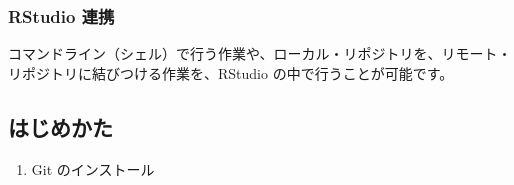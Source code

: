 \documentclass[
  xelatex, ja=standard]{bxjsbook}
\providecommand{\tightlist}{%
  \setlength{\itemsep}{0pt}\setlength{\parskip}{0pt}}
\theoremstyle{definition}
\theoremstyle{definition}
\theoremstyle{definition}
\theoremstyle{definition}
\theoremstyle{remark}
\begin{document}
\hypertarget{rstudio-ux9023ux643a}{%
\subsubsection{RStudio 連携}\label{rstudio-ux9023ux643a}}

コマンドライン（シェル）で行う作業や、ローカル・リポジトリを、リモート・リポジトリに結びつける作業を、RStudio の中で行うことが可能です。

\hypertarget{ux306fux3058ux3081ux304bux305f}{%
\subsection{はじめかた}\label{ux306fux3058ux3081ux304bux305f}}

\begin{enumerate}
\def\labelenumi{\arabic{enumi}.}
\tightlist
\item
  Git のインストール
\end{enumerate}
\end{document}
